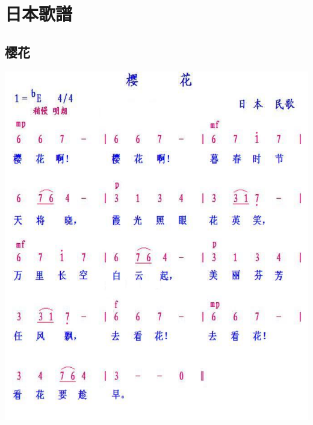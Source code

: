 \documentclass[cn,pad,twocol]{elegantbook}
\begin{document}
  
\chapter{日本歌譜}
\section{樱花}
	\includegraphics[width=\textwidth]{dongxiao/日本-樱花.jpg}  
\end{document}
